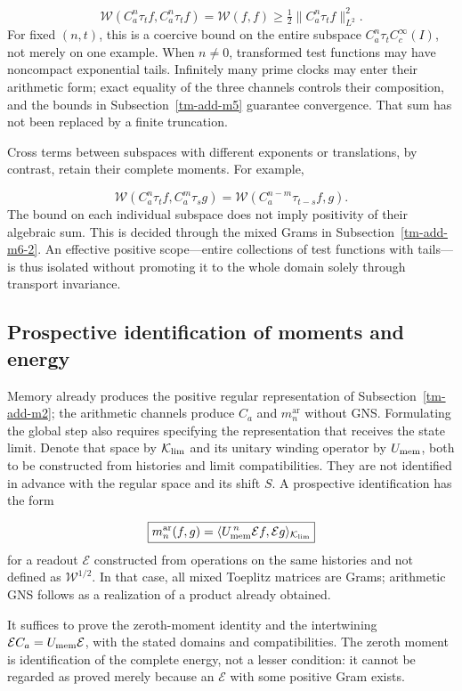 \[
\boxed{\mathscr W(C_a^n\tau_t f,C_a^n\tau_t f)
=\mathscr W(f,f)
\geq\tfrac12\|C_a^n\tau_t f\|_{L^2}^2.}
\]
For fixed \((n,t)\), this is a coercive bound on the entire subspace \(C_a^n\tau_t C_c^\infty(I)\), not merely on one example. When \(n\ne0\), transformed test functions may have noncompact exponential tails. Infinitely many prime clocks may enter their arithmetic form; exact equality of the three channels controls their composition, and the bounds in Subsection~\ref{tm-add-m5} guarantee convergence. That sum has not been replaced by a finite truncation.

Cross terms between subspaces with different exponents or translations, by contrast, retain their complete moments. For example,

\[
\mathscr W(C_a^n\tau_t f,C_a^m\tau_s g)
=\mathscr W(C_a^{n-m}\tau_{t-s}f,g).
\]
The bound on each individual subspace does not imply positivity of their algebraic sum. This is decided through the mixed Grams in Subsection~\ref{tm-add-m6-2}. An effective positive scope—entire collections of test functions with tails—is thus isolated without promoting it to the whole domain solely through transport invariance.


\subsection{Prospective identification of moments and energy}
\label{tm-add-m7}
Memory already produces the positive regular representation of
Subsection~\ref{tm-add-m2}; the arithmetic channels produce \(C_a\)
and \(m_n^{\mathrm{ar}}\) without GNS. Formulating the global step also requires
specifying the representation that receives the state limit.
Denote that space by \(\mathcal K_{\rm lim}\) and its unitary winding
operator by \(U_{\rm mem}\), both to be constructed
from histories and limit compatibilities. They are not
identified in advance with the regular space and its shift \(S\).
A prospective identification has the form

\[
\boxed{m_n^{\mathrm{ar}}(f,g)
=\langle U_{\rm mem}^{\,n}\mathcal E f,\mathcal E g\rangle_{\mathcal K_{\rm lim}}}
\]
for a readout \(\mathcal E\) constructed from operations on the same histories and not defined as \(\mathscr W^{1/2}\). In that case, all mixed Toeplitz matrices are Grams; arithmetic GNS follows as a realization of a product already obtained.

It suffices to prove the zeroth-moment identity and the intertwining
\(\mathcal E C_a=U_{\rm mem}\mathcal E\), with the stated domains and
compatibilities. The zeroth moment is identification of the
complete energy, not a lesser condition: it cannot be regarded as proved
merely because an \(\mathcal E\) with some positive Gram exists.

